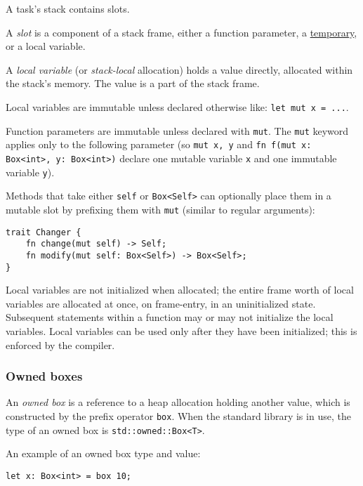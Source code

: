 \documentclass[]{article}
\begin{document}
A task's stack contains slots.

A \emph{slot} is a component of a stack frame, either a function
parameter, a \hyperref[lvaluesux2c-rvalues-and-temporaries]{temporary},
or a local variable.

A \emph{local variable} (or \emph{stack-local} allocation) holds a value
directly, allocated within the stack's memory. The value is a part of
the stack frame.

Local variables are immutable unless declared otherwise like:
\texttt{let mut x = ...}.

Function parameters are immutable unless declared with \texttt{mut}. The
\texttt{mut} keyword applies only to the following parameter (so
\texttt{\textbar{}mut x, y\textbar{}} and
\texttt{fn f(mut x: Box\textless{}int\textgreater{}, y: Box\textless{}int\textgreater{})}
declare one mutable variable \texttt{x} and one immutable variable
\texttt{y}).

Methods that take either \texttt{self} or
\texttt{Box\textless{}Self\textgreater{}} can optionally place them in a
mutable slot by prefixing them with \texttt{mut} (similar to regular
arguments):

\begin{verbatim}
trait Changer {
    fn change(mut self) -> Self;
    fn modify(mut self: Box<Self>) -> Box<Self>;
}
\end{verbatim}

Local variables are not initialized when allocated; the entire frame
worth of local variables are allocated at once, on frame-entry, in an
uninitialized state. Subsequent statements within a function may or may
not initialize the local variables. Local variables can be used only
after they have been initialized; this is enforced by the compiler.

\subsubsection{Owned boxes}\label{owned-boxes}

An \emph{owned box} is a reference to a heap allocation holding another
value, which is constructed by the prefix operator \texttt{box}. When
the standard library is in use, the type of an owned box is
\texttt{std::owned::Box\textless{}T\textgreater{}}.

An example of an owned box type and value:

\begin{verbatim}
let x: Box<int> = box 10;
\end{verbatim}
\end{document}
